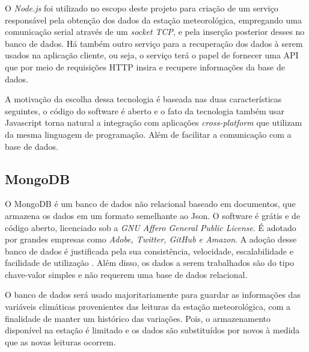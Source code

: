 O \textit{Node.js} foi utilizado no escopo deste projeto para criação de um serviço responsável pela obtenção dos dados da estação meteorológica, empregando uma comunicação serial através de um \textit{socket TCP}, e pela inserção posterior desses no banco de dados. Há também outro serviço para a recuperação dos dados à serem usados na aplicação cliente, ou seja, o serviço terá o papel de fornecer uma API que por meio de requisições HTTP insira e recupere informações da base de dados.

A motivação da escolha dessa tecnologia é baseada nas duas características seguintes, o código do software é aberto e o fato da tecnologia também usar Javascript torna natural a integração com aplicações \textit{cross-platform} que utilizam da mesma linguagem de programação. Além de facilitar a comunicação com a base de dados.


\subsection{MongoDB} \label{subsec:MongoDB}

O MongoDB é um banco de dados não relacional baseado em documentos, que armazena os dados em um formato semelhante ao Json. O software é grátis e de código aberto, licenciado sob a \textit{GNU Affero General Public License}. É adotado por grandes empresas como \textit{Adobe, Twitter, GitHub e Amazon}. A adoção desse banco de dados é justificada pela sua consistência, velocidade, escalabilidade e facilidade de utilização \cite{SITEMONGODB}. Além disso, os dados a serem trabalhados são do tipo chave-valor simples e não requerem uma base de dados relacional.

O banco de dados será usado majoritariamente para guardar as informações das variáveis climáticas provenientes das leituras da estação meteorológica, com a finalidade de manter um histórico das variações. Pois, o armazenamento disponível na estação é limitado e os dados são substituídos por novos à medida que as novas leituras ocorrem.





